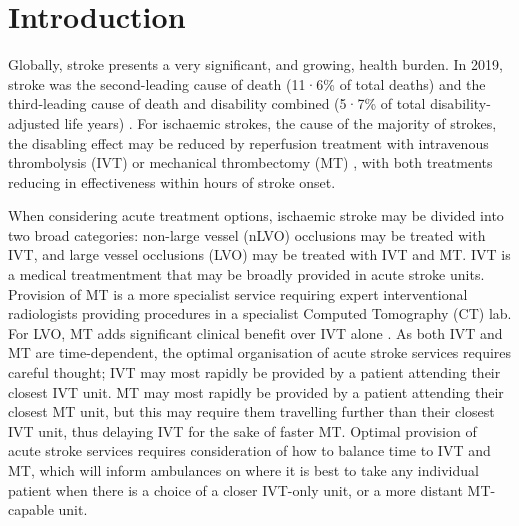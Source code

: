\section{Introduction}




Globally, stroke presents a very significant, and growing, health burden. In 2019, stroke was the second-leading cause of death (11·6\% of total deaths) and the third-leading cause of death and disability combined (5·7\% of total disability-adjusted life years) \cite{feigin_global_2021}. For ischaemic strokes, the cause of the majority of strokes, the disabling effect may be reduced by reperfusion treatment with intravenous thrombolysis (IVT) \cite{emberson_effect_2014} or mechanical thrombectomy (MT) \cite{fransen_time_2016, goyal_endovascular_2016}, with both treatments reducing in effectiveness within hours of stroke onset.


When considering acute treatment options, ischaemic stroke may be divided into two broad categories: non-large vessel (nLVO) occlusions may be treated with IVT, and large vessel occlusions (LVO) may be treated with IVT and MT. IVT is a medical treatmentment that may be broadly provided in acute stroke units. Provision of MT is a more specialist service requiring expert interventional radiologists providing procedures in a specialist Computed Tomography (CT) lab. For LVO, MT adds significant clinical benefit over IVT alone \cite{fransen_time_2016, goyal_endovascular_2016}. As both IVT and MT are time-dependent, the optimal organisation of acute stroke services requires careful thought; IVT may most rapidly be provided by a patient attending their closest IVT unit. MT may most rapidly be provided by a patient attending their closest MT unit, but this may require them travelling further than their closest IVT unit, thus delaying IVT for the sake of faster MT. Optimal provision of acute stroke services requires consideration of how to balance time to IVT and MT, which will inform ambulances on where it is best to take any individual patient when there is a choice of a closer IVT-only unit, or a more distant MT-capable unit.


